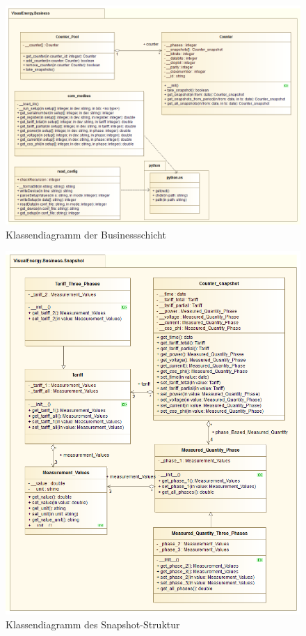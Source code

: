 \documentclass[Bachelorarbeit.tex]{subfiles}
\begin{document}
\begin{figure}
\centering
\includegraphics[width=0.9\linewidth]{./img/Klassendiagramm_Business}
\caption{Klassendiagramm der Businessschicht}
\label{pic:klassendiagramm_business}
\end{figure}

\begin{figure}
\centering
\includegraphics[width=0.9\linewidth]{./img/Klassendiagramm_Snapshot}
\caption{Klassendiagramm des Snapshot-Struktur}
\label{pic:klassendiagramm_snapshot}
\end{figure}
\end{document}
